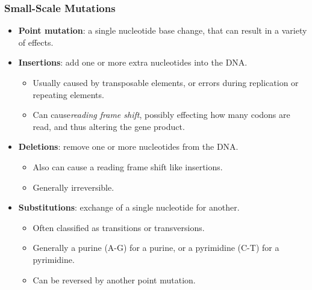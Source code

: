 \documentclass[12pt,a4paper]{article}
\begin{document}
\begin{itemize}
    \subsubsection{Small-Scale Mutations}
    \begin{itemize}
        \item \textbf{Point mutation}: a single nucleotide base change, that can result in a variety of effects.
        \item \textbf{Insertions}: add one or more extra nucleotides into the DNA.
            \begin{itemize}
                \item Usually caused by transposable elements, or errors during replication or repeating elements.
                \item Can cause\textit{reading frame shift}, possibly effecting how many codons are read, and thus altering the gene product.
            \end{itemize}
        \item \textbf{Deletions}: remove one or more nucleotides from the DNA.
            \begin{itemize}
                \item Also can cause a reading frame shift like insertions.
                \item Generally irreversible.
            \end{itemize}
        \item \textbf{Substitutions}: exchange of a single nucleotide for another.
            \begin{itemize}
                \item Often classified as transitions or transversions.
                \item Generally a purine (A-G) for a purine, or a pyrimidine (C-T) for a pyrimidine.
                \item Can be reversed by another point mutation.
            \end{itemize}
    \end{itemize}

\end{itemize}
\end{document}
